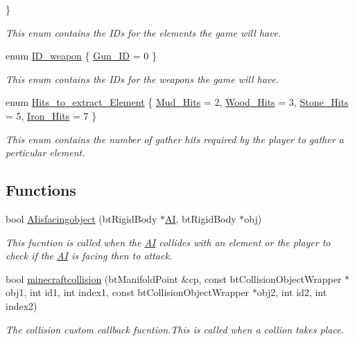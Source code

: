 \begin{DoxyCompactItemize}
 \}
\begin{DoxyCompactList}\small\item\em This enum contains the I\+Ds for the elements the game will have. \end{DoxyCompactList}\item 
enum \hyperlink{namespaceoctet_a9b5c767b2f5906d32938347f219f29d8}{I\+D\+\_\+weapon} \{ \hyperlink{namespaceoctet_a9b5c767b2f5906d32938347f219f29d8aba4bbd933933361c95782aeef88f84b6}{Gun\+\_\+\+I\+D} = 0
 \}
\begin{DoxyCompactList}\small\item\em This enum contains the I\+Ds for the weapons the game will have. \end{DoxyCompactList}\item 
enum \hyperlink{namespaceoctet_ae8a703c3351a9f48aa7ad96fc57c55b4}{Hits\+\_\+to\+\_\+extract\+\_\+\+Element} \{ \hyperlink{namespaceoctet_ae8a703c3351a9f48aa7ad96fc57c55b4a750c23f53924dfbcd9fb50ca61e8f480}{Mud\+\_\+\+Hits} = 2, 
\hyperlink{namespaceoctet_ae8a703c3351a9f48aa7ad96fc57c55b4a7827d8f1739c787a24f280dd43555860}{Wood\+\_\+\+Hits} = 3, 
\hyperlink{namespaceoctet_ae8a703c3351a9f48aa7ad96fc57c55b4aed66fa47b7558f768b7e5e30cd526e89}{Stone\+\_\+\+Hits} = 5, 
\hyperlink{namespaceoctet_ae8a703c3351a9f48aa7ad96fc57c55b4a05e2baa4de05be589af50ab12a54ab67}{Iron\+\_\+\+Hits} = 7
 \}
\begin{DoxyCompactList}\small\item\em This enum contains the number of gather hits required by the player to gather a perticular element. \end{DoxyCompactList}\end{DoxyCompactItemize}
\subsection*{Functions}
\begin{DoxyCompactItemize}
\item 
bool \hyperlink{namespaceoctet_a18649e9a2945ba720f8b1454433bffb9}{A\+Iisfacingobject} (bt\+Rigid\+Body $\ast$\hyperlink{structoctet_1_1_a_i}{A\+I}, bt\+Rigid\+Body $\ast$obj)
\begin{DoxyCompactList}\small\item\em This fucntion is called when the \hyperlink{structoctet_1_1_a_i}{A\+I} collides with an element or the player to check if the \hyperlink{structoctet_1_1_a_i}{A\+I} is facing then to attack. \end{DoxyCompactList}\item 
bool \hyperlink{namespaceoctet_a612adfaf8e4ba9b7d22fec5b9a2672b7}{minecraftcollision} (bt\+Manifold\+Point \&cp, const bt\+Collision\+Object\+Wrapper $\ast$obj1, int id1, int index1, const bt\+Collision\+Object\+Wrapper $\ast$obj2, int id2, int index2)
\begin{DoxyCompactList}\small\item\em The collision custom callback fucntion.\+This is called when a collion takes place. \end{DoxyCompactList}\end{DoxyCompactItemize}
